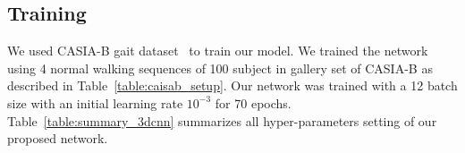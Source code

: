 \subsection{Training}
We used CASIA-B gait dataset~\cite{Yu_06} to train our model. We trained the network using 4 normal walking sequences of 100 subject in gallery set of CASIA-B as described in Table~\ref{table:caisab_setup}. Our network was trained with a 12 batch size with an initial learning rate ${10^{-3}}$ for 70 epochs. Table~\ref{table:summary_3dcnn} summarizes all hyper-parameters setting of our proposed network.


